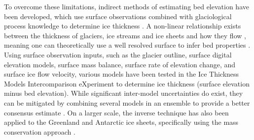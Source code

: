 \documentclass[tc, manuscript]{copernicus}
\begin{document}
To overcome these limitations, indirect methods of estimating bed elevation have been developed, which use surface observations combined with glaciological process knowledge to determine ice thickness \citep[e.g.][]{vanPeltiterativeinversemethod2013}.
A non-linear relationship exists between the thickness of glaciers, ice streams and ice sheets and how they flow \citep{Raymondrelationshipsurfacebasal2005}, meaning one can theoretically use a well resolved surface to infer bed properties \citep[e.g.][]{Farinottimethodestimateice2009}.
Using surface observation inputs, such as the glacier outline, surface digital elevation models, surface mass balance, surface rate of elevation change, and surface ice flow velocity, various models have been tested in the Ice Thickness Models Intercomparison eXperiment \citep[ITMIX,][]{FarinottiHowaccurateare2017} to determine ice thickness (surface elevation minus bed elevation).
While significant inter-model uncertainties do exist, they can be mitigated by combining several models in an ensemble to provide a better consensus estimate \citep{Farinotticonsensusestimateice2019}.
On a larger scale, the inverse technique has also been applied to the Greenland \citep{MorlighemBedMachinev3Complete2017} and Antarctic \citep{MorlighemDeepglacialtroughs2019} ice sheets, specifically using the mass conservation approach \citep{Morlighemmassconservationapproach2011}.
\end{document}
